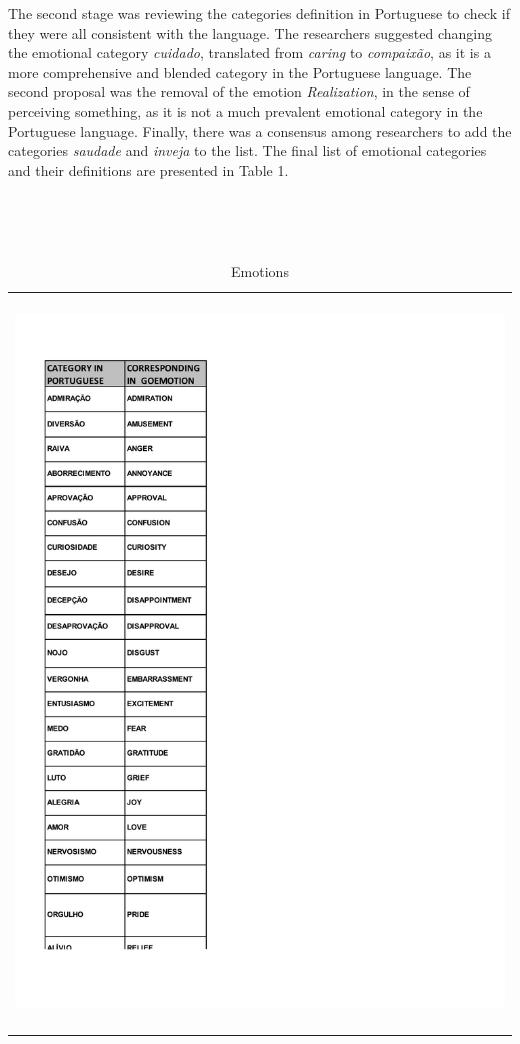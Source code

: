 \documentclass[12pt]{article}
\begin{document}
The second stage was reviewing the categories definition in Portuguese to check if they were all consistent with the language. The researchers suggested changing the emotional category \textit{cuidado}, translated from \textit{caring} to \textit{compaixão}, as it is a more comprehensive and blended category in the Portuguese language. The second proposal was the removal of the emotion \textit{Realization}, in the sense of perceiving something, as it is not a much prevalent emotional category in the Portuguese language. Finally, there was a consensus among researchers to add the categories \textit{saudade} and \textit{inveja} to the list. The final list of emotional categories and their definitions are presented in Table 1.

\begin{table}
  \caption{Emotions}
  \label{tab:emotions}
  \begin{tabularx}{\textwidth}{X}
    \includegraphics[trim=0cm 0cm 0cm 0cm, clip, width=\textwidth]{img-n-tables/EMOCOES}
  \end{tabularx}
\end{table}
\end{document}
